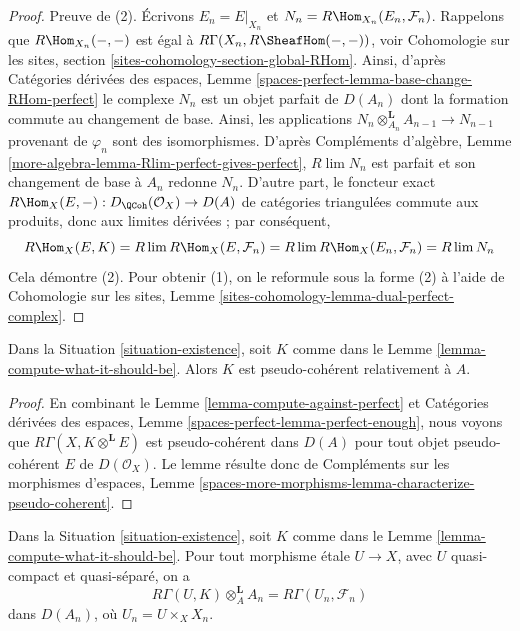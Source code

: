 \begin{proof}
Preuve de (2). Écrivons $E_n = E|_{X_n}$ et
$N_n = R\Hom_{X_n}(E_n, \mathcal{F}_n)$.
Rappelons que $R\Hom_{X_n}(-, -)$ est égal à
$R\Gamma(X_n, R\SheafHom(-, -))$, voir
Cohomologie sur les sites, section \ref{sites-cohomology-section-global-RHom}.
Ainsi, d'après Catégories dérivées des espaces, Lemme
\ref{spaces-perfect-lemma-base-change-RHom-perfect}
le complexe $N_n$ est un objet parfait de $D(A_n)$
dont la formation commute au changement de base. Ainsi, les applications
$N_n \otimes_{A_n}^\mathbf{L} A_{n - 1} \to N_{n - 1}$
provenant de $\varphi_n$ sont des isomorphismes.
D'après Compléments d'algèbre, Lemme \ref{more-algebra-lemma-Rlim-perfect-gives-perfect},
$R\lim N_n$ est parfait et
son changement de base à $A_n$ redonne $N_n$.
D'autre part, le foncteur exact
$R\Hom_X(E, -) : D_\QCoh(\mathcal{O}_X) \to D(A)$
de catégories triangulées commute aux produits,
donc aux limites dérivées ; par conséquent,
$$
R\Hom_X(E, K) =
R\lim R\Hom_X(E, \mathcal{F}_n) =
R\lim R\Hom_X(E_n, \mathcal{F}_n) =
R\lim N_n
$$
Cela démontre (2). Pour obtenir (1), on le reformule sous la forme (2)
à l'aide de Cohomologie sur les sites, Lemme
\ref{sites-cohomology-lemma-dual-perfect-complex}.
\end{proof}

\begin{lemma}
\label{lemma-relative-pseudo-coherence}
Dans la Situation \ref{situation-existence}, soit $K$ comme dans le
Lemme \ref{lemma-compute-what-it-should-be}. Alors $K$
est pseudo-cohérent relativement à $A$.
\end{lemma}

\begin{proof}
En combinant le Lemme \ref{lemma-compute-against-perfect} et
Catégories dérivées des espaces, Lemme \ref{spaces-perfect-lemma-perfect-enough},
nous voyons que $R\Gamma(X, K \otimes^\mathbf{L} E)$
est pseudo-cohérent dans $D(A)$ pour tout objet pseudo-cohérent
$E$ de $D(\mathcal{O}_X)$. Le lemme résulte donc de
Compléments sur les morphismes d'espaces, Lemme
\ref{spaces-more-morphisms-lemma-characterize-pseudo-coherent}.
\end{proof}

\begin{lemma}
\label{lemma-compute-over-affine}
Dans la Situation \ref{situation-existence}, soit $K$ comme dans le
Lemme \ref{lemma-compute-what-it-should-be}. Pour tout
morphisme \'etale $U \to X$, avec $U$ quasi-compact et quasi-séparé, on a
$$
R\Gamma(U, K) \otimes_A^\mathbf{L} A_n =
R\Gamma(U_n, \mathcal{F}_n)
$$
dans $D(A_n)$, où $U_n = U \times_X X_n$.
\end{lemma}

